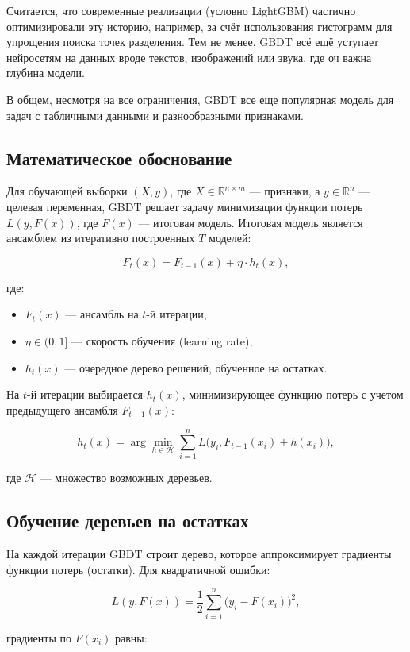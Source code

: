 Считается, что современные реализации (условно LightGBM) частично оптимизировали эту историю, например, за счёт использования гистограмм для упрощения поиска точек разделения. Тем не менее, GBDT всё ещё уступает нейросетям на данных вроде текстов, изображений или звука, где оч важна глубина модели.

В общем, несмотря на все ограничения, GBDT все еще популярная модель для задач с табличными данными и разнообразными признаками.

\subsection*{Математическое обоснование}

Для обучающей выборки \((X, y)\), где \(X \in \mathbb{R}^{n \times m}\) — признаки, а \(y \in \mathbb{R}^n\) — целевая переменная, GBDT решает задачу минимизации функции потерь \(L(y, F(x))\), где \(F(x)\) — итоговая модель. Итоговая модель является ансамблем из итеративно построенных \(T\) моделей:

\[
    F_t(x) = F_{t-1}(x) + \eta \cdot h_t(x),
\]

где:
\begin{itemize}
    \item \(F_t(x)\) — ансамбль на \(t\)-й итерации,
    \item \(\eta \in (0, 1]\) — скорость обучения (learning rate),
    \item \(h_t(x)\) — очередное дерево решений, обученное на остатках.
\end{itemize}

На \(t\)-й итерации выбирается \(h_t(x)\), минимизирующее функцию потерь с учетом предыдущего ансамбля \(F_{t-1}(x)\):

\[
    h_t(x) = \arg\min_{h \in \mathcal{H}} \sum_{i=1}^n L\big(y_i, F_{t-1}(x_i) + h(x_i)\big),
\]

где \(\mathcal{H}\) — множество возможных деревьев.


\subsection*{Обучение деревьев на остатках}

На каждой итерации GBDT строит дерево, которое аппроксимирует градиенты функции потерь (остатки). Для квадратичной ошибки:

\[
    L(y, F(x)) = \frac{1}{2} \sum_{i=1}^n \big(y_i - F(x_i)\big)^2,
\]

градиенты по \(F(x_i)\) равны:

